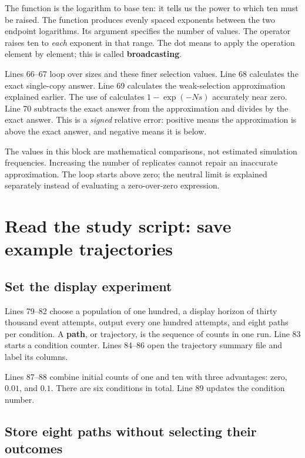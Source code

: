 The function  is the logarithm to base ten: it tells us the
power to which ten must be raised. The function  produces
evenly spaced exponents between the two endpoint logarithms. Its
 argument specifies the number of values. The operator
 raises ten to \emph{each} exponent in that range. The dot
means to apply the operation element by element; this is called
\textbf{broadcasting}.

Lines 66--67 loop over sizes and these finer selection values. Line 68
calculates the exact single-copy answer. Line 69 calculates the
weak-selection approximation explained earlier. The use of
 calculates \(1-\exp(-Ns)\) accurately near zero.
Line 70 subtracts the exact answer from the approximation and divides by
the exact answer. This is a \emph{signed} relative error: positive means
the approximation is above the exact answer, and negative means it is below.

The values in this block are mathematical comparisons, not estimated
simulation frequencies. Increasing the number of replicates cannot repair
an inaccurate approximation. The loop starts above zero; the neutral limit
is explained separately instead of evaluating a zero-over-zero expression.

\section{Read the study script: save example trajectories}



\subsection{Set the display experiment}

Lines 79--82 choose a population of one hundred, a display horizon of thirty
thousand event attempts, output every one hundred attempts, and eight paths
per condition. A \textbf{path}, or trajectory, is the sequence of counts in
one run. Line 83 starts a condition counter. Lines 84--86 open the trajectory
summary file and label its columns.

Lines 87--88 combine initial counts of one and ten with three advantages:
zero, \(0.01\), and \(0.1\). There are six conditions in total. Line 89
updates the condition number.

\subsection{Store eight paths without selecting their outcomes}

